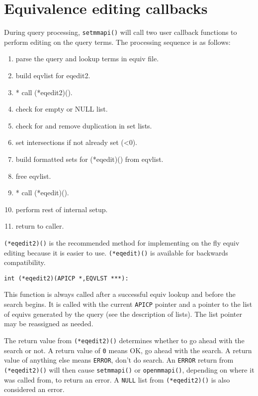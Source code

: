 \section{Equivalence editing callbacks}

During query processing, \verb`setmmapi()` will call two user callback
functions to perform editing on the query terms. The processing
sequence is as follows:
\begin{enumerate}
\item  parse the query and lookup terms in equiv file.
\item  build eqvlist for eqedit2.
\item * call (*eqedit2)().
\item  check for empty or NULL list.
\item  check for and remove duplication in set lists.
\item  set intersections if not already set (<0).
\item  build formatted sets for (*eqedit)() from eqvlist.
\item  free eqvlist.
\item * call (*eqedit)().
\item  perform rest of internal setup.
\item  return to caller.
\end{enumerate}

\verb`(*eqedit2)()` is the recommended method for implementing on the fly
equiv editing because it is easier to use.  \verb`(*eqedit)()` is
available for backwards compatibility.

\begin{verbatim}
int (*eqedit2)(APICP *,EQVLST ***):
\end{verbatim}

This function is always called after a successful equiv lookup and
before the search begins.  It is called with the current \verb`APICP`
pointer and a pointer to the list of equivs generated by the query
(see the description of lists).  The list pointer may be
reassigned as needed.

The return value from \verb`(*eqedit2)()` determines whether to go ahead
with the search or not.  A return value of \verb`0` means OK, go ahead
with the search.  A return value of anything else means \verb`ERROR`,
don't do search.  An \verb`ERROR` return from \verb`(*eqedit2)()` will then
cause \verb`setmmapi()` or \verb`openmmapi()`, depending on where it was called
from, to return an error.  A \verb`NULL` list from \verb`(*eqedit2)()` is also
considered an error.

